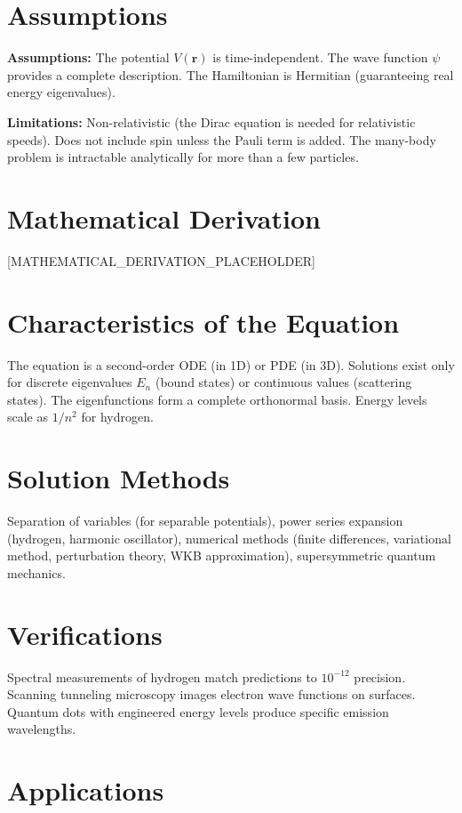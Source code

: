 \documentclass[11pt,openright]{book}
\begin{document}
\section*{Assumptions}

\textbf{Assumptions:} The potential $V(\mathbf{r})$ is time-independent. The wave function $\psi$ provides a complete description. The Hamiltonian is Hermitian (guaranteeing real energy eigenvalues).


\textbf{Limitations:} Non-relativistic (the Dirac equation is needed for relativistic speeds). Does not include spin unless the Pauli term is added. The many-body problem is intractable analytically for more than a few particles.


\section*{Mathematical Derivation}

[MATHEMATICAL_DERIVATION_PLACEHOLDER]

\section*{Characteristics of the Equation}

The equation is a second-order ODE (in 1D) or PDE (in 3D). Solutions exist only for discrete eigenvalues $E_n$ (bound states) or continuous values (scattering states). The eigenfunctions form a complete orthonormal basis. Energy levels scale as $1/n^2$ for hydrogen.
\section*{Solution Methods}

Separation of variables (for separable potentials), power series expansion (hydrogen, harmonic oscillator), numerical methods (finite differences, variational method, perturbation theory, WKB approximation), supersymmetric quantum mechanics.
\section*{Verifications}

Spectral measurements of hydrogen match predictions to $10^{-12}$ precision. Scanning tunneling microscopy images electron wave functions on surfaces. Quantum dots with engineered energy levels produce specific emission wavelengths.
\section*{Applications}
\end{document}
